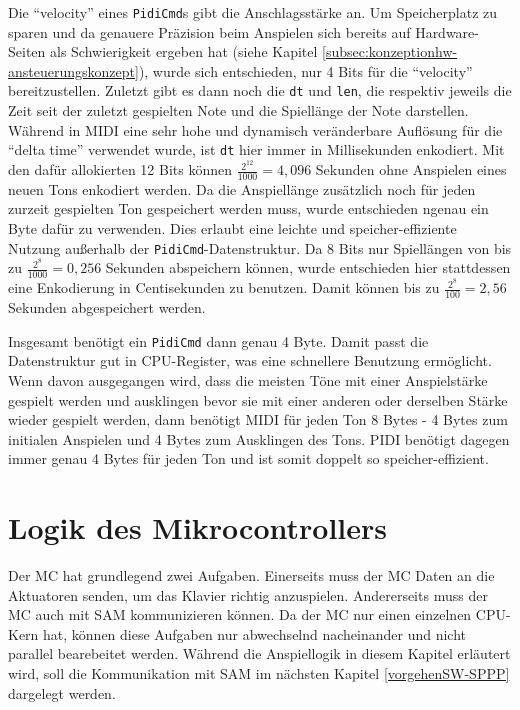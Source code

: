Die \enquote{velocity} eines \lstinline{PidiCmd}s gibt die Anschlagsstärke an.
Um Speicherplatz zu sparen und da genauere Präzision beim Anspielen sich bereits auf Hardware-Seiten als Schwierigkeit ergeben hat (siehe Kapitel \ref{subsec:konzeptionhw-ansteuerungskonzept}), wurde sich entschieden, nur 4 Bits für die \enquote{velocity} bereitzustellen.
Zuletzt gibt es dann noch die \lstinline{dt} und \lstinline{len}, die respektiv jeweils die Zeit seit der zuletzt gespielten Note und die Spiellänge der Note darstellen. \newline
Während in \ac{MIDI} eine sehr hohe und dynamisch veränderbare Auflösung für die \enquote{delta time} verwendet wurde, ist \lstinline{dt} hier immer in Millisekunden enkodiert.
Mit den dafür allokierten 12 Bits können $\frac{2^{12}}{1000} = 4,096$ Sekunden ohne Anspielen eines neuen Tons enkodiert werden. \newline
Da die Anspiellänge zusätzlich noch für jeden zurzeit gespielten Ton gespeichert werden muss, wurde entschieden ngenau ein Byte dafür zu verwenden.
Dies erlaubt eine leichte und speicher-effiziente Nutzung außerhalb der \lstinline{PidiCmd}-Datenstruktur.
Da 8 Bits nur Spiellängen von bis zu $\frac{2^8}{1000} = 0,256$ Sekunden abspeichern können, wurde entschieden hier stattdessen eine Enkodierung in Centisekunden zu benutzen.
Damit können bis zu $\frac{2^8}{100} = 2,56$ Sekunden abgespeichert werden.

Insgesamt benötigt ein \lstinline{PidiCmd} dann genau 4 Byte.
Damit passt die Datenstruktur gut in CPU-Register, was eine schnellere Benutzung ermöglicht.
Wenn davon ausgegangen wird, dass die meisten Töne mit einer Anspielstärke gespielt werden und ausklingen bevor sie mit einer anderen oder derselben Stärke wieder gespielt werden, dann benötigt \ac{MIDI} für jeden Ton 8 Bytes - 4 Bytes zum initialen Anspielen und 4 Bytes zum Ausklingen des Tons.
\ac{PIDI} benötigt dagegen immer genau 4 Bytes für jeden Ton und ist somit doppelt so speicher-effizient.


\section{Logik des Mikrocontrollers} \label{vorgehenSW-MC}

Der \ac{MC} hat grundlegend zwei Aufgaben.
Einerseits muss der \ac{MC} Daten an die Aktuatoren senden, um das Klavier richtig anzuspielen.
Andererseits muss der \ac{MC} auch mit \ac{SAM} kommunizieren können.
Da der \ac{MC} nur einen einzelnen CPU-Kern hat, können diese Aufgaben nur abwechselnd nacheinander und nicht parallel bearebeitet werden.
Während die Anspiellogik in diesem Kapitel erläutert wird, soll die Kommunikation mit \ac{SAM} im nächsten Kapitel \ref{vorgehenSW-SPPP} dargelegt werden.

